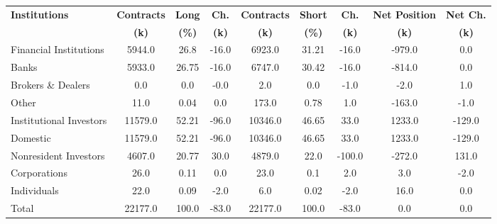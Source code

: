 \documentclass[article,crop=false]{standalone}%
\begin{document}
%
\normalsize%
\setlength{\tabcolsep}{0.15cm}%
\begin{tabular}[h]{l | c c c | c c c | c c}%
\hline%
\rowcolor{white}%
\textbf{Institutions}&\textbf{Contracts}&\textbf{Long}&\textbf{Ch.}&\textbf{Contracts}&\textbf{Short}&\textbf{Ch.}&\textbf{Net Position}&\textbf{Net Ch.}\\%
\rowcolor{white}%
\textbf{}&\textbf{(k)}&\textbf{(\%)}&\textbf{(k)}&\textbf{(k)}&\textbf{(\%)}&\textbf{(k)}&\textbf{(k)}&\textbf{(k)}\\%
\hline%
\rowcolor{lightgray}%
Financial Institutions&5944.0&26.8&{-}16.0&6923.0&31.21&{-}16.0&{-}979.0&0.0\\%
\rowcolor{white}%
Banks&5933.0&26.75&{-}16.0&6747.0&30.42&{-}16.0&{-}814.0&0.0\\%
\rowcolor{lightgray}%
Brokers \& Dealers&0.0&0.0&{-}0.0&2.0&0.0&{-}1.0&{-}2.0&1.0\\%
\rowcolor{white}%
Other&11.0&0.04&0.0&173.0&0.78&1.0&{-}163.0&{-}1.0\\%
\rowcolor{lightgray}%
Institutional Investors&11579.0&52.21&{-}96.0&10346.0&46.65&33.0&1233.0&{-}129.0\\%
\rowcolor{white}%
Domestic&11579.0&52.21&{-}96.0&10346.0&46.65&33.0&1233.0&{-}129.0\\%
\rowcolor{lightgray}%
Nonresident Investors&4607.0&20.77&30.0&4879.0&22.0&{-}100.0&{-}272.0&131.0\\%
\rowcolor{white}%
Corporations&26.0&0.11&0.0&23.0&0.1&2.0&3.0&{-}2.0\\%
\rowcolor{lightgray}%
Individuals&22.0&0.09&{-}2.0&6.0&0.02&{-}2.0&16.0&0.0\\%
\rowcolor{white}%
Total&22177.0&100.0&{-}83.0&22177.0&100.0&{-}83.0&0.0&0.0\\%
\hline%
\end{tabular}%
\end{document}
